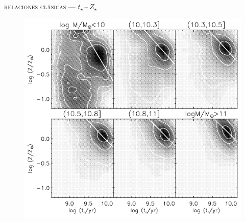 \documentclass[xcolor=dvipsnames,4pt,hyperref={colorlinks,citecolor=black,linkcolor=black,urlcolor=black}]{beamer}
\begin{document}
\begin{frame}{\textsc{relaciones clásicas --- $t_\star\,$--$\,Z_\star$}}

\begin{figure}
\includegraphics[scale=1]{img/gallazzi2005-12}
\end{figure}
\end{frame}
\end{document}
